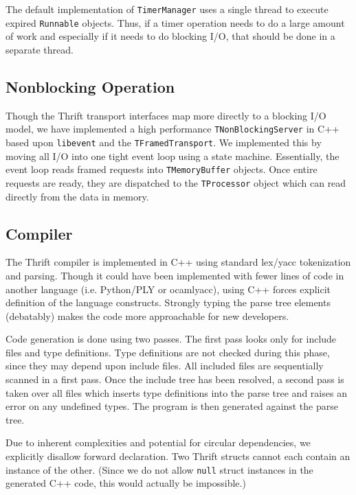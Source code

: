 \documentclass[nocopyrightspace,blockstyle]{sigplanconf}
\begin{document}
The default implementation of \texttt{TimerManager} uses a single thread to
execute expired \texttt{Runnable} objects. Thus, if a timer operation needs to 
do a large amount of work and especially if it needs to do blocking I/O,
that should be done in a separate thread.

\subsection{Nonblocking Operation}
Though the Thrift transport interfaces map more directly to a blocking I/O
model, we have implemented a high performance \texttt{TNonBlockingServer}
in C++ based upon \texttt{libevent} and the \texttt{TFramedTransport}. We
implemented this by moving all I/O into one tight event loop using a
state machine. Essentially, the event loop reads framed requests into
\texttt{TMemoryBuffer} objects. Once entire requests are ready, they are
dispatched to the \texttt{TProcessor} object which can read directly from
the data in memory.

\subsection{Compiler}
The Thrift compiler is implemented in C++ using standard lex/yacc
tokenization and parsing. Though it could have been implemented with fewer
lines of code in another language (i.e. Python/PLY or ocamlyacc), using C++
forces explicit definition of the language constructs. Strongly typing the
parse tree elements (debatably) makes the code more approachable for new
developers.

Code generation is done using two passes. The first pass looks only for
include files and type definitions. Type definitions are not checked during
this phase, since they may depend upon include files. All included files
are sequentially scanned in a first pass. Once the include tree has been
resolved, a second pass is taken over all files which inserts type definitions
into the parse tree and raises an error on any undefined types. The program is
then generated against the parse tree.

Due to inherent complexities and potential for circular dependencies,
we explicitly disallow forward declaration. Two Thrift structs cannot
each contain an instance of the other. (Since we do not allow \texttt{null}
struct instances in the generated C++ code, this would actually be impossible.)
\end{document}
